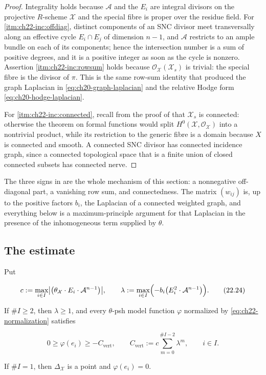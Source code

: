 \begin{proof}
Integrality holds because \(\mathcal A\) and the \(E_i\) are integral
divisors on the projective \(R\)-scheme \(\mathcal X\) and the special fibre
is proper over the residue field.  For
\cref{itm:ch22-inc:offdiag}, distinct components of an SNC divisor meet
transversally along an effective cycle \(E_i\cap E_j\) of dimension
\(n-1\), and \(\mathcal A\) restricts to an ample bundle on each of its
components; hence the intersection number is a sum of positive degrees, and
it is a positive integer as soon as the cycle is nonzero.  Assertion
\cref{itm:ch22-inc:rowsum} holds because
\(\mathcal O_{\mathcal X}(\mathcal X_s)\) is trivial: the special fibre is
the divisor of \(\pi\).  This is the same row-sum identity that produced the
graph Laplacian in \eqref{eq:ch20-graph-laplacian} and the relative Hodge
form \eqref{eq:ch20-hodge-laplacian}.

For \cref{itm:ch22-inc:connected}, recall from the proof of
 that \(\mathcal X_s\) is connected: otherwise the
theorem on formal functions would split
\(H^0(\mathcal X,\mathcal O_{\mathcal X})\) into a nontrivial product, while
its restriction to the generic fibre is a domain because \(X\) is connected
and smooth.  A connected SNC divisor has connected incidence graph, since a
connected topological space that is a finite union of closed connected
subsets has connected nerve.
\end{proof}

The three signs in  are the whole mechanism of
this section: a nonnegative off-diagonal part, a vanishing row sum, and
connectedness.  The matrix \((w_{ij})\) is, up to the positive factors
\(b_i\), the Laplacian of a connected weighted graph, and everything below is
a maximum-principle argument for that Laplacian in the presence of the
inhomogeneous term supplied by \(\theta\).

\subsection{The estimate}

\begin{proposition}
\label{prop:ch22-vertex-estimate}
Put

\[
 c:=\max_{i\in I}\bigl|\bigl(\theta_{\mathcal X}\cdot E_i\cdot
       \mathcal A^{n-1}\bigr)\bigr|,
 \qquad
 \lambda:=\max_{i\in I}\Bigl(-b_i\bigl(E_i^2\cdot
       \mathcal A^{n-1}\bigr)\Bigr).
\tag{22.24}\label{eq:ch22-lambda}
\]

If \(\#I\geq2\), then \(\lambda\geq1\), and every \(\theta\)-psh model
function \(\varphi\) normalized by \eqref{eq:ch22-normalization} satisfies

\[
 0\geq\varphi(e_i)\geq-C_{\mathrm{vert}},
 \qquad
 C_{\mathrm{vert}}:=c\sum_{m=0}^{\#I-2}\lambda^m,
 \qquad i\in I .
\tag{22.25}\label{eq:ch22-vertex-lower-bound}
\]

If \(\#I=1\), then \(\Delta_{\mathcal X}\) is a point and
\(\varphi(e_i)=0\).
\end{proposition}

